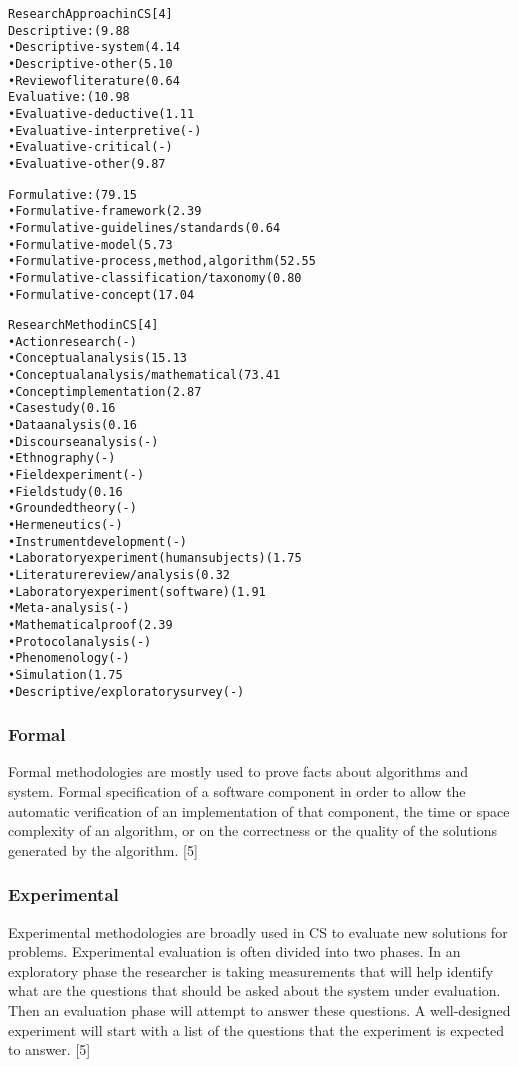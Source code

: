 \begin{alltt}
  Research Approach in CS [4]
  Descriptive: (9.88%)
  •	Descriptive-system (4.14%)
  •	Descriptive-other (5.10%)
  •	Review of literature (0.64%)
  Evaluative: (10.98%)
  •	Evaluative-deductive (1.11%)
  •	Evaluative-interpretive (-)
  •	Evaluative-critical (-)
  •	Evaluative-other (9.87%)

  Formulative: (79.15%)
  •	Formulative-framework (2.39%)
  •	Formulative-guidelines/standards (0.64%)
  •	Formulative-model (5.73%)
  •	Formulative-process, method, algorithm (52.55%)
  •	Formulative-classification/taxonomy (0.80%)
  •	Formulative-concept (17.04%)

   Research Method in CS [4]
  •	Action research (-)
  •	Conceptual analysis (15.13%)
  •	Conceptual analysis/mathematical (73.41%)
  •	Concept implementation (2.87%)
  •	Case study (0.16%)
  •	Data analysis (0.16%)
  •	Discourse analysis (-)
  •	Ethnography (-)
  •	Field experiment (-)
  •	Field study (0.16%)
  •	Grounded theory (-)
  •	Hermeneutics (-)
  •	Instrument development (-)
  •	Laboratory experiment (human subjects) (1.75%)
  •	Literature review / analysis (0.32%)
  •	Laboratory experiment (software) (1.91%)
  •	Meta-analysis (-)
  •	Mathematical proof (2.39%)
  •	Protocol analysis (-)
  •	Phenomenology (-)
  •	Simulation (1.75%)
  •	Descriptive/exploratory survey (-)
\end{alltt}

\subsubsection*{Formal}

Formal methodologies are mostly used to prove facts about algorithms and system. Formal specification of a software component in order to allow the automatic verification of an implementation of that component, the time or space complexity of an algorithm, or on the correctness or the quality of the solutions generated by the algorithm. [5]

\subsubsection*{Experimental}

Experimental methodologies are broadly used in CS to evaluate new solutions for problems. Experimental evaluation is often divided into two phases. In an exploratory phase the researcher is taking measurements that will help identify what are the questions that should be asked about the system under evaluation. Then an evaluation phase will attempt to answer these questions. A well-designed experiment will start with a list of the questions that the experiment is expected to answer. [5]

